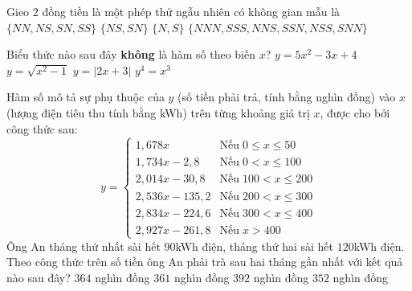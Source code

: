 \begin{ex}%
	Gieo $2$ đồng tiền là một phép thử  ngẫu nhiên có không gian mẫu là
	\choice 
		 {\True $\{NN,NS,SN,SS\}$}
		 {$\{NS,SN\}$}
		 {$\{N,S\}$}
		 {$\{NNN,SSS,NNS,SSN,NSS,SNN\}$}
\end{ex}

\begin{ex}%
	Biểu thức nào  sau đây \textbf{không} là hàm số theo biến $x$?
	 \choice
		{$y=5x^2-3x+4$} 
		{$y=\sqrt{x^2-1}$} 
		{$y=\left|2x+3\right|$} 
		{\True $y^4=x^3$} 
\end{ex}

\begin{ex}%
	Hàm số  mô tả sự phụ thuộc của $y$ (số tiền phải trả, tính bằng nghìn đồng) vào $x$ (lượng điện tiêu thu tính bằng kWh) trên từng khoảng giá trị $x$, được cho bởi công thức sau:
	$$ 
	y= \begin{cases}1{,}678 x & \text{Nếu}\; 0 \leq x \leq 50 \\ 1{,}734 x-2{,}8 & \text{Nếu}\; 0<x \leq 100 \\ 2{,}014 x-30{,}8 &\text{Nếu}\; 100<x \leq 200 \\ 2{,}536 x-135{,}2 &\text{Nếu}\; 200<x \leq 300 \\ 2{,}834 x-224{,}6 &\text{Nếu}\; 300<x \leq 400 \\ 2{,}927 x-261{,}8 & \text{Nếu}\; x>400
\end{cases}
$$ 
Ông An tháng thứ nhất sài hết $90$kWh điện, tháng thứ hai sài hết $120$kWh điện. Theo công thức trên số tiền ông An phải trà sau hai tháng gần nhất với kết quả nào  sau đây?
\choice 
	{\True $364$ nghìn  đồng}
	{$361$ nghìn đồng} 
	 {$392$ nghìn đồng}
	 {$352$ nghìn đồng}
\end{ex}


